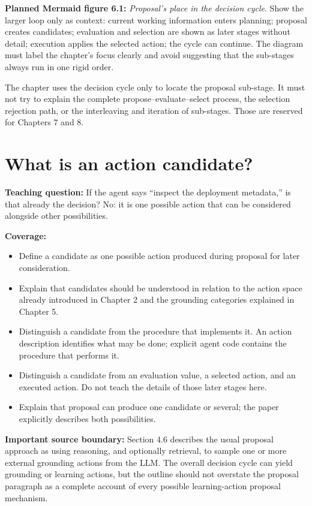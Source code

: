 \textbf{Planned Mermaid figure 6.1:} \emph{Proposal's place in the decision cycle}. Show the larger loop only as context: current working information enters planning; proposal creates candidates; evaluation and selection are shown as later stages without detail; execution applies the selected action; the cycle can continue. The diagram must label the chapter's focus clearly and avoid suggesting that the sub-stages always run in one rigid order. 

\begin{notebox}
The chapter uses the decision cycle only to locate the proposal sub-stage. It must not try to explain the complete propose--evaluate--select process, the selection rejection path, or the interleaving and iteration of sub-stages. Those are reserved for Chapters 7 and 8.
\end{notebox}

\section{What is an action candidate?}
\textbf{Teaching question:} If the agent says ``inspect the deployment metadata,'' is that already the decision? No: it is one possible action that can be considered alongside other possibilities.

\textbf{Coverage:}
\begin{itemize}
  \item Define a candidate as one possible action produced during proposal for later consideration.
  \item Explain that candidates should be understood in relation to the action space already introduced in Chapter 2 and the grounding categories explained in Chapter 5.
  \item Distinguish a candidate from the procedure that implements it. An action description identifies what may be done; explicit agent code contains the procedure that performs it.
  \item Distinguish a candidate from an evaluation value, a selected action, and an executed action. Do not teach the details of those later stages here.
  \item Explain that proposal can produce one candidate or several; the paper explicitly describes both possibilities.
\end{itemize}

\textbf{Important source boundary:} Section 4.6 describes the usual proposal approach as using reasoning, and optionally retrieval, to sample one or more external grounding actions from the LLM. The overall decision cycle can yield grounding or learning actions, but the outline should not overstate the proposal paragraph as a complete account of every possible learning-action proposal mechanism. 

